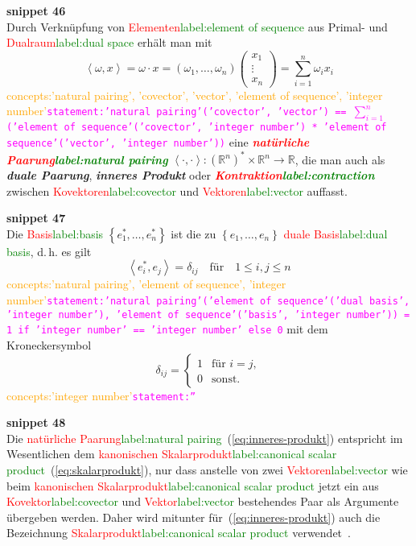 \documentclass[a4paper,twoside,english,ngerman,deutsch,german,sectrefs,envcountsame,envcountchap]{svmono}
\newcommand{\setref}[2]{\textcolor{red}{#1}\textcolor{green}{#2}}
\newcommand{\snippet}[1]{\textbf{snippet #1}\\}
\newcommand{\eqnote}[2]{\textcolor{orange}{#1}\textcolor{magenta}{\texttt{#2}}}
\begin{document}
\snippet{46}
Durch Verknüpfung von \setref{Elementen}{label:element of sequence} aus Primal- und \setref{Dualraum}{label:dual space} erhält man mit
\begin{equation}
\left\langle \omega,x\right\rangle =\omega\cdot x=\left(\omega_{1},\ldots,\omega_{n}\right)\left(\begin{array}{c}
x_{1}\\
\vdots\\
x_{n}
\end{array}\right)=\sum_{i=1}^{n}\omega_{i}x_{i}\label{eq:inneres-produkt}
\end{equation}\eqnote{concepts:'natural pairing', 'covector', 'vector', 'element of sequence', 'integer number'}{statement:'natural pairing'('covector', 'vector') == $\sum_{i=1}^{n}$ ('element of sequence'('covector', 'integer number') * 'element of sequence'('vector', 'integer number'))}
eine \textbf{\em \setref{natürliche Paarung}{label:natural pairing}}  $\left\langle \cdot,\cdot\right\rangle :({\mathbb{R}}^{n})^{*}\times{\mathbb{R}}^{n}\to{\mathbb{R}}$, die man auch als \textbf{\em duale Paarung}, \textbf{\em inneres Produkt} oder \textbf{\em \setref{Kontraktion}{label:contraction}} zwischen \setref{Kovektoren}{label:covector} und \setref{Vektoren}{label:vector} auffasst.

\snippet{47}
Die \setref{Basis}{label:basis} $\left\{ e_{1}^{*},\ldots,e_{n}^{*}\right\} $ ist die zu $\left\{ e_{1},\ldots,e_{n}\right\} $ \setref{duale Basis}{label:dual basis}, d.\,h. es gilt
\[
\left\langle e_{i}^{*},e_{j}\right\rangle =\delta_{ij}\quad\textrm{für}\quad1\leq i,j\leq n
\]\eqnote{concepts:'natural pairing', 'element of sequence', 'integer number'}{statement:'natural pairing'('element of sequence'('dual basis', 'integer number'), 'element of sequence'('basis', 'integer number')) = 1 if 'integer number' == 'integer number' else 0}
mit dem Kroneckersymbol
\[
\delta_{ij}=\left\{ \begin{array}{cl}
1 & \textrm{für }i=j,\\ 0 & \textrm{sonst.}
\end{array}\right.
\]\eqnote{concepts:'integer number'}{statement:''}

\snippet{48}
Die \setref{natürliche Paarung}{label:natural pairing}~(\eqref{eq:inneres-produkt}) entspricht im Wesentlichen dem \setref{kanonischen Skalarprodukt}{label:canonical scalar product}~(\eqref{eq:skalarprodukt}), nur dass anstelle von zwei \setref{Vektoren}{label:vector} wie beim \setref{kanonischen Skalarprodukt}{label:canonical scalar product} jetzt ein aus \setref{Kovektor}{label:covector} und \setref{Vektor}{label:vector} bestehendes Paar als Argumente übergeben werden. Daher wird mitunter für~(\eqref{eq:inneres-produkt}) auch die Bezeichnung
\setref{Skalarprodukt}{label:canonical scalar product} verwendet~\cite{bishop1980}.
\end{document}
